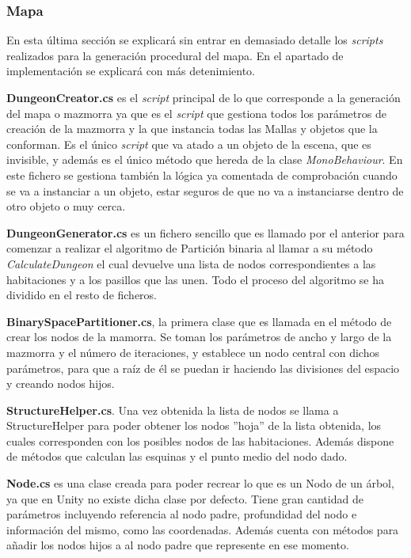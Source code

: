 \subsubsection{Mapa}

En esta última sección se explicará sin entrar en demasiado detalle los \textit{scripts} realizados para la generación procedural del mapa. En el apartado de implementación se explicará con más detenimiento.

\textbf{DungeonCreator.cs} es el \textit{script} principal de lo que corresponde a la generación del mapa o mazmorra ya que es el \textit{script} que gestiona todos los parámetros de creación de la mazmorra y la que instancia todas las Mallas y objetos que la conforman. Es el único \textit{script} que va atado a un objeto de la escena, que es invisible, y además es el único método que hereda de la clase \textit{MonoBehaviour}. En este fichero se gestiona también la lógica ya comentada de comprobación cuando se va a instanciar a un objeto, estar seguros de que no va a instanciarse dentro de otro objeto o muy cerca.

\textbf{DungeonGenerator.cs} es un fichero sencillo que es llamado por el anterior para comenzar a realizar el algoritmo de Partición binaria al llamar a su método \textit{CalculateDungeon} el cual devuelve una lista de nodos correspondientes a las habitaciones y a los pasillos que las unen. Todo el proceso del algoritmo se ha dividido en el resto de ficheros.

\textbf{BinarySpacePartitioner.cs}, la primera clase que es llamada en el método de crear los nodos de la mamorra. Se toman los parámetros de ancho y largo de la mazmorra y el número de iteraciones, y establece un nodo central con dichos parámetros, para que a raíz de él se puedan ir haciendo las divisiones del espacio y creando nodos hijos.

\textbf{StructureHelper.cs}. Una vez obtenida la lista de nodos se llama a StructureHelper para poder obtener los nodos ''hoja'' de la lista obtenida, los cuales corresponden con los posibles nodos de las habitaciones. Además dispone de métodos que calculan las esquinas y el punto medio del nodo dado.

\textbf{Node.cs} es una clase creada para poder recrear lo que es un Nodo de un árbol, ya que en Unity no existe dicha clase por defecto. Tiene gran cantidad de parámetros incluyendo referencia al nodo padre, profundidad del nodo e información del mismo, como las coordenadas. Además cuenta con métodos para añadir los nodos hijos a al nodo padre que represente en ese momento. 

